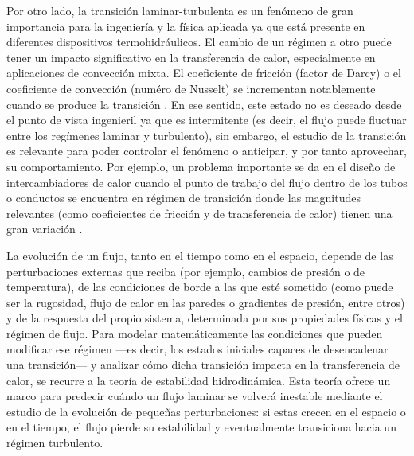 Por otro lado, la transición laminar-turbulenta es un fenómeno de gran importancia para la ingeniería y la física aplicada ya que está presente en diferentes dispositivos termohidráulicos. El cambio de un régimen a otro puede tener un impacto significativo en la transferencia de calor, especialmente en aplicaciones de convección mixta. El coeficiente de fricción (factor de Darcy) o el coeficiente de convección (numéro de Nusselt) se incrementan notablemente cuando se produce la transición \cite{incropera,white}. En ese sentido, este estado no es deseado desde el punto de vista ingenieril ya que es intermitente (es decir, el flujo puede fluctuar entre los regímenes laminar y turbulento), sin embargo, el estudio de la transición es relevante para poder controlar el fenómeno o anticipar, y por tanto aprovechar, su comportamiento. Por ejemplo, un problema importante se da en el diseño de intercambiadores de calor cuando el punto de trabajo del flujo dentro de los tubos o conductos se encuentra en régimen de transición donde las magnitudes relevantes (como coeficientes de fricción y de transferencia de calor) tienen una gran variación \cite{ghajar2019heat}.

La evolución de un flujo, tanto en el tiempo como en el espacio, depende de las perturbaciones externas que reciba (por ejemplo, cambios de presión o de temperatura), de las condiciones de borde a las que esté sometido (como puede ser la rugosidad, flujo de calor en las paredes o gradientes de presión, entre otros) y de la respuesta del propio sistema, determinada por sus propiedades físicas y el régimen de flujo. Para modelar matemáticamente las condiciones que pueden modificar ese régimen —es decir, los estados iniciales capaces de desencadenar una transición— y analizar cómo dicha transición impacta en la transferencia de calor, se recurre a la teoría de estabilidad hidrodinámica. Esta teoría ofrece un marco para predecir cuándo un flujo laminar se volverá inestable mediante el estudio de la evolución de pequeñas perturbaciones: si estas crecen en el espacio o en el tiempo, el flujo pierde su estabilidad y eventualmente transiciona hacia un régimen turbulento.

